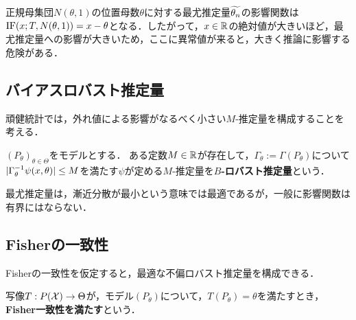 \documentclass[uplatex,dvipdfmx]{jsreport}
\begin{document}
\begin{example}
    正規母集団$N(\theta,1)$の位置母数$\theta$に対する最尤推定量$\widetilde{\theta_n}$の影響関数は$\mathrm{IF}(x;T,N(\theta,1))=x-\theta$となる．したがって，$x\in\mathbb{R}$の絶対値が大きいほど，最尤推定量への影響が大きいため，ここに異常値が来ると，大きく推論に影響する危険がある．
\end{example}

\subsection{バイアスロバスト推定量}

\begin{tcolorbox}[colframe=ForestGreen, colback=ForestGreen!10!white,breakable,colbacktitle=ForestGreen!40!white,coltitle=black,fonttitle=\bfseries\sffamily,
title=]
    頑健統計では，外れ値による影響がなるべく小さい$M$-推定量を構成することを考える．
\end{tcolorbox}

\begin{definition}
    $(P_\theta)_{\theta\in\Theta}$をモデルとする．
    ある定数$M\in\mathbb{R}$が存在して，$\Gamma_\theta:=\Gamma(P_\theta)$について$\lvert\Gamma^{-1}_\theta\psi(x,\theta)\rvert\le M$を満たす$\psi$が定める$M$-推定量を\textbf{$B$-ロバスト推定量}という．
\end{definition}

\begin{example}
    最尤推定量は，漸近分散が最小という意味では最適であるが，一般に影響関数は有界にはならない．
\end{example}

\subsection{Fisherの一致性}

\begin{tcolorbox}[colframe=ForestGreen, colback=ForestGreen!10!white,breakable,colbacktitle=ForestGreen!40!white,coltitle=black,fonttitle=\bfseries\sffamily,
title=]
    Fisherの一致性を仮定すると，最適な不偏ロバスト推定量を構成できる．
\end{tcolorbox}

\begin{definition}
    写像$T:P(\mathcal{X})\to\Theta$が，モデル$(P_\theta)$について，$T(P_\theta)=\theta$を満たすとき，\textbf{Fisher一致性を満たす}という．
\end{definition}
\end{document}
